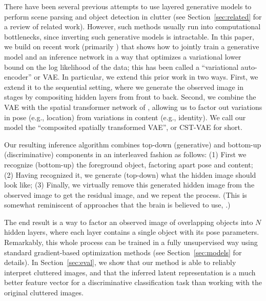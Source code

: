  There have been several previous attempts to use layered generative
models to perform scene parsing and object detection in clutter (see
Section~\ref{sec:related} for a review of related work). However, such
methods usually run into computational bottlenecks, since inverting
such generative models is intractable.
In this paper, we build on recent work (primarily \cite{Kingma2014,gregor2015draw})
that shows how to jointly train a generative model and an inference
network in a way that optimizes a variational lower bound on the log
likelihood of the data;
this has been called a ``variational auto-encoder'' or VAE.
In particular, we extend this prior work in
two ways. First, we extend it to the sequential setting, where we
generate the observed image in stages by compositing hidden layers
from front to back. %
Second, we combine the VAE with the spatial transformer network of
\citep{jaderberg2015spatial}, allowing us to factor out variations
in pose (e.g., location) from variations in content (e.g., identity).
We call our model the ``composited spatially transformed VAE'', or CST-VAE
for short.

Our resulting inference algorithm combines top-down (generative)
and bottom-up (discriminative) components in an interleaved fashion as follows:
(1)  First we recognize (bottom-up) the foreground object, factoring apart pose and content;
(2) Having recognized it, we generate (top-down) what the hidden image  should look
like;
(3) Finally, we virtually remove this generated hidden image from the observed
image to get the residual image, and we repeat the process.
(This is somewhat reminiscent of approaches that the brain is believed
to use, \cite{Hochstein2002}.)

The end result is a way to factor an observed image of
overlapping objects into $N$
hidden layers, where each layer contains a single object
with its pose parameters.
Remarkably, this whole process can be trained in a fully unsupervised
way using standard gradient-based optimization methods
(see Section~\ref{sec:models} for details).
In Section~\ref{sec:eval}, we show that our method is able to reliably
interpret cluttered images, and that the inferred latent
representation is a much better  feature vector for a discriminative
classification task than working with the original cluttered images.

\vspace{-3mm}


